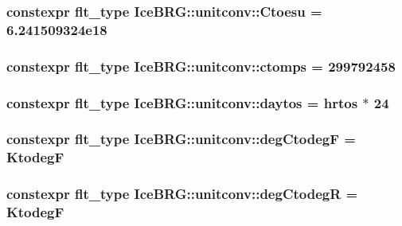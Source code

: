 \subsubsection[{Ctoesu}]{\setlength{\rightskip}{0pt plus 5cm}constexpr {\bf flt\+\_\+type} Ice\+B\+R\+G\+::unitconv\+::\+Ctoesu = 6.\+241509324e18}\label{namespaceIceBRG_1_1unitconv_a53360211812748d35f99d2fa652b173b}
\hypertarget{namespaceIceBRG_1_1unitconv_a4452bf41e30df2caf01bd4494fb7da32}{}
\subsubsection[{ctomps}]{\setlength{\rightskip}{0pt plus 5cm}constexpr {\bf flt\+\_\+type} Ice\+B\+R\+G\+::unitconv\+::ctomps = 299792458}\label{namespaceIceBRG_1_1unitconv_a4452bf41e30df2caf01bd4494fb7da32}
\hypertarget{namespaceIceBRG_1_1unitconv_aed5d6912a78832dde44187bc926f2b35}{}
\subsubsection[{daytos}]{\setlength{\rightskip}{0pt plus 5cm}constexpr {\bf flt\+\_\+type} Ice\+B\+R\+G\+::unitconv\+::daytos = {\bf hrtos} $\ast$ 24}\label{namespaceIceBRG_1_1unitconv_aed5d6912a78832dde44187bc926f2b35}
\hypertarget{namespaceIceBRG_1_1unitconv_ab11230c975f66a2cf991fa56b1ebda61}{}
\subsubsection[{deg\+Ctodeg\+F}]{\setlength{\rightskip}{0pt plus 5cm}constexpr {\bf flt\+\_\+type} Ice\+B\+R\+G\+::unitconv\+::deg\+Ctodeg\+F = {\bf Ktodeg\+F}}\label{namespaceIceBRG_1_1unitconv_ab11230c975f66a2cf991fa56b1ebda61}
\hypertarget{namespaceIceBRG_1_1unitconv_ac518ebad84e8217ca0ff94a1d9f00b34}{}
\subsubsection[{deg\+Ctodeg\+R}]{\setlength{\rightskip}{0pt plus 5cm}constexpr {\bf flt\+\_\+type} Ice\+B\+R\+G\+::unitconv\+::deg\+Ctodeg\+R = {\bf Ktodeg\+F}}\label{namespaceIceBRG_1_1unitconv_ac518ebad84e8217ca0ff94a1d9f00b34}
\hypertarget{namespaceIceBRG_1_1unitconv_a9075e94de0082aeaf9e31c47c732e2e3}{}
